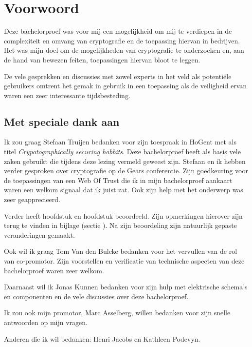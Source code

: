 
\chapter*{Voorwoord}
\label{ch:voorwoord}


Deze bachelorproef was voor mij een mogelijkheid om mij te verdiepen in de
complexiteit en omvang van cryptografie en de toepassing hiervan in bedrijven.
Het was mijn doel om de mogelijkheden van cryptografie te onderzoeken en, aan de
hand van bewezen feiten, toepassingen hiervan bloot te leggen.

De vele gesprekken en discussies met zowel experts in het veld als potentiële
gebruikers omtrent het gemak in gebruik in een toepassing als de veiligheid
ervan waren een zeer interessante tijdsbesteding.

\section*{Met speciale dank aan}
Ik zou graag Stefaan Truijen bedanken voor zijn toespraak in HoGent met als
titel \textit{Crypotographically securing habbits}. Deze bachelorproef heeft als
basis vele zaken gebruikt die tijdens deze lezing vermeld geweest zijn. Stefaan
en ik hebben verder gesproken over cryptografie op de Gears conferentie. Zijn
goedkeuring voor de toepassingen van een Web Of Trust die ik in mijn
bachelorproef aankaart waren een welkom signaal dat ik juist zat. Ook zijn help
met het onderwerp \textit{}  was
zeer geapprecieerd.

Verder heeft \textcite{TruijenStefaan} hoofdstuk
 en hoofdstuk
 beoordeeld. Zijn opmerkingen
hierover zijn terug te vinden in bijlage (sectie
). Na zijn beoordeling zijn
natuurlijk gepaste veranderingen gemaakt.

Ook wil ik graag Tom Van den Bulcke bedanken voor het vervullen van de rol van co-promotor. Zijn voorstellen en verificatie van technische aspecten van deze bachelorproef waren zeer welkom.

Daarnaast wil ik Jonas Kunnen bedanken voor zijn hulp met elektrische schema's en componenten en de vele discussies over deze bachelorproef.

Ik zou ook mijn promotor, Marc Asselberg, willen bedanken voor zijn snelle antwoorden op mijn vragen.

Anderen die ik wil bedanken: Henri Jacobs en Kathleen Podevyn.
